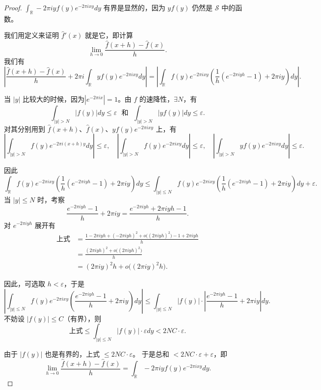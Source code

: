 \documentclass[12pt]{ctexart}  %
\begin{document}
\begin{proof}
\vspace{0.5em}
\(\displaystyle
\int_{\mathbb{R}} -2\pi i y f(y) e^{-2\pi i x y} dy
\)
有界是显然的，因为 \(y f(y)\) 仍然是 \(\mathcal{S}\) 中的函数。

\vspace{0.5em}
我们用定义来证明 \(\hat{f}'(x)\) 就是它，即计算
\[
\lim_{h\to0} \frac{\hat{f}(x+h) - \hat{f}(x)}{h}.
\]
我们有
\[
\left| \frac{\hat{f}(x+h) - \hat{f}(x)}{h} + 2\pi i \int_{\mathbb{R}} y f(y) e^{-2\pi i x y} dy \right|
= \left| \int_{\mathbb{R}} f(y) e^{-2\pi i x y} \left( \frac{1}{h}(e^{-2\pi i y h} - 1) + 2\pi i y \right) dy \right|.
\]

当 \(|y|\) 比较大的时候，因为\(|e^{-2\pi i x}| = 1\)。由 \(f\) 的速降性，\(\exists N\)，有
\[
\int_{|y|>N} |f(y)| dy \le \varepsilon \ \ \ \text{和} \ \ \ \int_{|y|>N} |yf(y)| dy \le \varepsilon.
\]
对其分别用到 \(\hat{f}(x+h)\)、\(\hat{f}(x)\)、\(y f(y) e^{-2\pi i x y}\) 上，有
\[
\left| \int_{|y|>N} f(y) e^{-2\pi i (x+h) y} dy \right| \le \varepsilon,\quad
\left| \int_{|y|>N} f(y) e^{-2\pi i x y} dy \right| \le \varepsilon,\quad
\left| \int_{|y|>N} y f(y) e^{-2\pi i x y} dy \right| \le \varepsilon.
\]

因此
\[
\int_{\mathbb{R}} f(y) e^{-2\pi i x y} \left( \frac{1}{h}(e^{-2\pi i y h} - 1) + 2\pi i y \right) dy
\le \int_{|y|\le N} f(y) e^{-2\pi i x y} \left( \frac{1}{h}(e^{-2\pi i y h} - 1) + 2\pi i y \right) dy
+ \varepsilon.
\]
当 \(|y|\le N\) 时，考察
\[
\frac{e^{-2\pi i y h} - 1}{h} + 2\pi i y = \frac{e^{-2\pi i y h} + 2\pi i y h - 1}{h}.
\]
对 \(e^{-2\pi i y h}\) 展开有
\[
\begin{aligned}
\text{上式} &= \frac{1 - 2\pi i y h + (-2\pi i y h)^2 + o\bigl((2\pi i y h)^2\bigr) - 1 + 2\pi i y h}{h} \\
&= \frac{(2\pi i y h)^2 + o\bigl((2\pi i y h)^2\bigr)}{h} \\
&= (2\pi i y)^2 h + o\bigl((2\pi i y)^2 h\bigr).
\end{aligned}
\]

因此，可选取 \(h < \varepsilon\)，于是
\[
\left| \int_{|y|\le N} f(y) e^{-2\pi i x y} \left( \frac{e^{-2\pi i y h} - 1}{h} + 2\pi i y \right) dy \right|
\le \int_{|y|\le N} |f(y)| \cdot \left| \frac{e^{-2\pi i y h} - 1}{h} + 2\pi i y \right| dy.
\]
不妨设 \(|f(y)|\le C\)（有界），则
\[
\text{上式} \le \int_{|y|\le N} |f(y)| \cdot \varepsilon dy < 2NC \cdot \varepsilon.
\]

由于 \(|f(y)|\) 也是有界的，上式 \(\le 2NC \cdot \varepsilon\)。
于是总和 \(< 2NC \cdot \varepsilon + \varepsilon\)，即
\[
\lim_{h\to0} \frac{\hat{f}(x+h) - \hat{f}(x)}{h} = \int_{\mathbb{R}} -2\pi i y f(y) e^{-2\pi i x y} dy.
\]


\end{proof}
\end{document}
